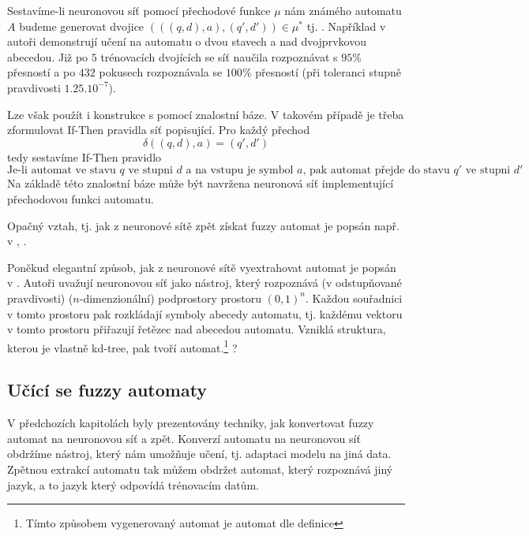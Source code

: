 \documentclass[a4paper,10pt]{article}
\begin{document}
Sestavíme-li neuronovou síť pomocí přechodové funkce $\mu$ nám známého automatu $A$ budeme  generovat dvojice $(((q, d), a), (q', d')) \in \mu^*$  tj. . Například v \cite{BlaDelPeg-FuzzAutIndUsNeuNet} autoři demonstrují učení na automatu o dvou stavech a nad dvojprvkovou abecedou. Již po $5$ trénovacích dvojících se síť naučila rozpoznávat s $95\%$ přesností a po $432$ pokusech rozpoznávala se $100\%$ přesností (při toleranci stupně pravdivosti $1.25 . 10^{-7}$).

Lze však použít i konstrukce s pomocí znalostní báze. V takovém případě je třeba zformulovat If-Then pravidla síť popisující. Pro každý přechod
$$
 \delta((q, d), a) = (q', d')
$$
tedy sestavíme If-Then pravidlo
$$
 \text{Je-li automat ve stavu $q$ ve stupni $d$ a na vstupu je symbol $a$, pak automat přejde do stavu $q'$ ve stupni $d'$}
$$
Na základě této znalostní báze může být navržena neuronová síť implementující přechodovou funkci automatu.

Opačný vztah, tj. jak z neuronové sítě zpět získat fuzzy automat je popsán např. v \cite{BlaDelFlo-MethIndFuzzAutUsNeuNet}, \cite{BlaDelPeg-FuzzGraIntUsiNeuNet}. 

Poněkud elegantní způsob, jak z neuronové sítě vyextrahovat automat je popsán v \cite{BlaDelFlo-MethIndFuzzAutUsNeuNet}. Autoři uvažují neuronovou síť jako nástroj, který rozpoznává (v odstupňované pravdivosti) ($n$-dimenzionální) podprostory prostoru $(0, 1)^n$. Každou souřadnici v tomto prostoru pak rozkládají symboly abecedy automatu, tj. každému vektoru v tomto prostoru přiřazují řetězec nad abecedou automatu. Vzniklá struktura, kterou je vlastně kd-tree, pak tvoří automat.\footnote{Tímto způsobem vygenerovaný automat je automat dle definice } ?


\subsection{Učící se fuzzy automaty}

V předchozích kapitolách byly prezentovány techniky, jak konvertovat fuzzy automat na neuronovou síť a zpět. Konverzí automatu na neuronovou síť obdržíme nástroj, který nám umožňuje učení, tj. adaptaci modelu na jiná data. Zpětnou extrakcí automatu tak můžem obdržet automat, který rozpoznává jiný jazyk, a to jazyk který odpovídá trénovacím datům.
\end{document}

